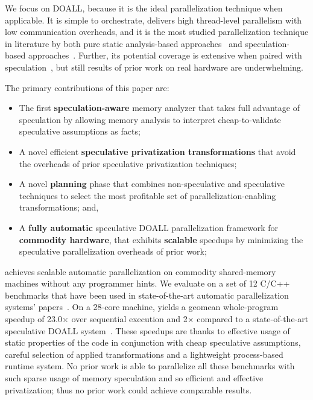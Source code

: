 We focus on DOALL, because it is the ideal parallelization technique when
applicable. It is simple to orchestrate, delivers high thread-level parallelism
with low communication overheads, and it is the most studied parallelization
technique in literature by both pure static analysis-based
approaches~\cite{..,.,..} and speculation-based approaches~\cite{..,..,..,..}.
Further, its potential coverage is extensive when paired with
speculation~\cite{zhong:08:hpca}, but still results of prior work on real
hardware are underwhelming.

The primary contributions of this paper are:
\begin{itemize}

\item The first \textbf{speculation-aware} memory analyzer that takes
full advantage of speculation by allowing memory analysis to interpret
cheap-to-validate speculative assumptions as facts;

\item A novel efficient \textbf{speculative privatization transformations}
that avoid the overheads of prior speculative privatization
techniques;

\item A novel \textbf{planning} phase that combines non-speculative
and speculative techniques to select the most profitable set of
parallelization-enabling transformations; and,

\item A \textbf{fully automatic} speculative DOALL parallelization
framework for \textbf{commodity hardware}, that exhibits
\textbf{scalable} speedups by minimizing the speculative
parallelization overheads of prior work;

\end{itemize}

\name achieves scalable automatic parallelization on commodity
shared-memory machines without any programmer hints.  We evaluate
\name on a set of 12 C/C++ benchmarks that have been used in
state-of-the-art automatic parallelization systems'
papers~\cite{johnson:12:pldi,kim:12:cgo,campanoni:12:cgo}. On a
28-core machine, \name yields a geomean whole-program speedup of
23.0$\times$ over sequential execution and 2$\times$ compared to a
state-of-the-art speculative DOALL system~\cite{johnson:12:pldi}.
These speedups are thanks to effective usage of static properties of
the code in conjunction with cheap speculative assumptions,
%
careful selection of applied transformations and a lightweight
process-based runtime system.  No prior work is able to parallelize
all these benchmarks with such sparse usage of memory speculation and
so efficient and effective privatization; thus no prior work could
achieve comparable results.
